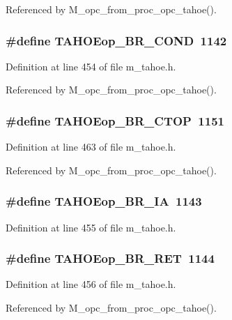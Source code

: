 Referenced by M\_\-opc\_\-from\_\-proc\_\-opc\_\-tahoe().
\subsubsection{\setlength{\rightskip}{0pt plus 5cm}\#define TAHOEop\_\-BR\_\-COND~1142}\label{m__tahoe_8h_3180df010460686119ffaed0b1aecba1}




Definition at line 454 of file m\_\-tahoe.h.

Referenced by M\_\-opc\_\-from\_\-proc\_\-opc\_\-tahoe().
\subsubsection{\setlength{\rightskip}{0pt plus 5cm}\#define TAHOEop\_\-BR\_\-CTOP~1151}\label{m__tahoe_8h_36a1cc8fcc4dca8e6957e8748c0b9879}




Definition at line 463 of file m\_\-tahoe.h.

Referenced by M\_\-opc\_\-from\_\-proc\_\-opc\_\-tahoe().
\subsubsection{\setlength{\rightskip}{0pt plus 5cm}\#define TAHOEop\_\-BR\_\-IA~1143}\label{m__tahoe_8h_81c8fd330587cbcaa6ceaa2ab34aa991}




Definition at line 455 of file m\_\-tahoe.h.
\subsubsection{\setlength{\rightskip}{0pt plus 5cm}\#define TAHOEop\_\-BR\_\-RET~1144}\label{m__tahoe_8h_d3773e0afc6332ba3aa9e4227cb1a1c3}




Definition at line 456 of file m\_\-tahoe.h.

Referenced by M\_\-opc\_\-from\_\-proc\_\-opc\_\-tahoe().
